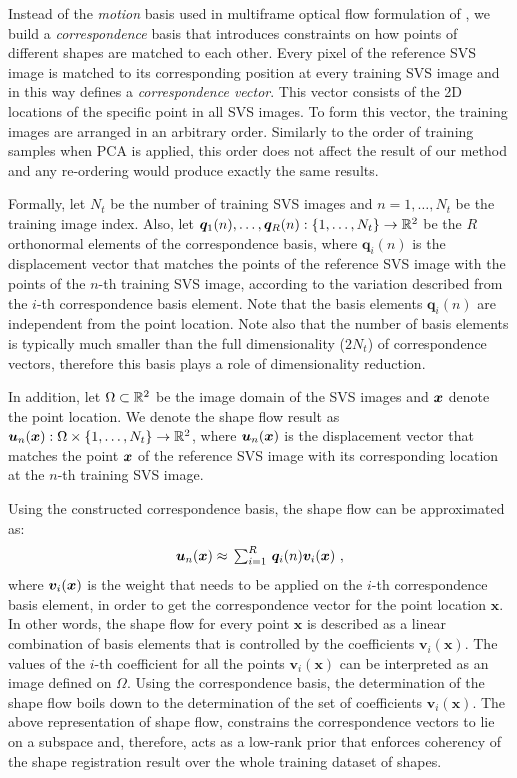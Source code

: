 Instead of the \emph{motion} basis used in multiframe optical flow formulation of \cite{Garg:2013hu}, we build a \emph{correspondence} basis that introduces constraints on how points of different shapes are matched to each other. Every pixel of the reference SVS image is matched to its corresponding position at every training SVS image and in this way defines a \emph{correspondence vector}. This vector consists of the 2D locations of the specific point in all SVS images. To form this vector, the training images are arranged in an arbitrary order. Similarly to the order of training samples when PCA is applied, this order does not affect the result of our method and any re-ordering would produce exactly the same results.


Formally, let $N_t$ be the number of training SVS images and $n=1,\ldots,N_t$ be the training image index. Also, let $\boldsymbol{q}_1(n),\ldots,\boldsymbol{q}_R(n):
\{1,\ldots,N_t\} \rightarrow \mathbb{R}^2$ be the $R$ orthonormal elements of the correspondence basis, where $\boldsymbol{q}_i(n)$ is the displacement vector that matches the points of the reference SVS image with the points of the $n$-th training SVS image, according to the variation described from the $i$-th correspondence basis element. Note that the basis elements $\boldsymbol{q}_i(n)$ are independent from the point location. Note also that the number of basis elements is typically much smaller than the full dimensionality ($2 N_t$) of correspondence vectors, therefore this basis plays a role of dimensionality reduction.


In addition, let $\Omega \subset \mathbb{R}^2$ be the image domain of the SVS images and $\boldsymbol{x}$ denote the point location. We denote the shape flow result as $\bm{u}_n(\boldsymbol{x}):\Omega\times \{1,\ldots,N_t\}
\rightarrow \mathbb{R}^2$,  where $\bm{u}_n(\boldsymbol{x})$ is the displacement vector that matches the point $\boldsymbol{x}$ of the reference SVS image with its corresponding location at the $n$-th training SVS image.

Using the constructed correspondence basis, the shape flow can be approximated as:
\vspace{-5pt}
\begin{equation}\label{eq:LinTrajModel}
    \bm{u}_n(\bx) \approx
    \textstyle \, \sum_{i=1}^R \, \bm{q}_i(n)\bm{v}_i(\bx) \,\, ,
\vspace{-5pt}
\end{equation}
where $\bm{v}_i(\boldsymbol{x})$ is the weight that needs to be applied on the $i$-th correspondence basis element, in order to get the correspondence vector for the point location $\bm{x}$. In other words, the shape flow for every point $\bm{x}$ is described as a linear combination of basis elements that is controlled by the coefficients $\bm{v}_i(\bm{x})$.
The values of the $i$-th coefficient for all the points $\bm{v}_i(\bm{x})$ can be interpreted as an image defined on $\Omega$. Using the correspondence basis, the determination of the shape flow boils down to the determination of the set of coefficients $\bm{v}_i(\bm{x})$. The above representation of shape flow, constrains the correspondence vectors to lie on a subspace and, therefore, acts as a low-rank prior that enforces coherency of the shape registration result over the whole training dataset of shapes.


